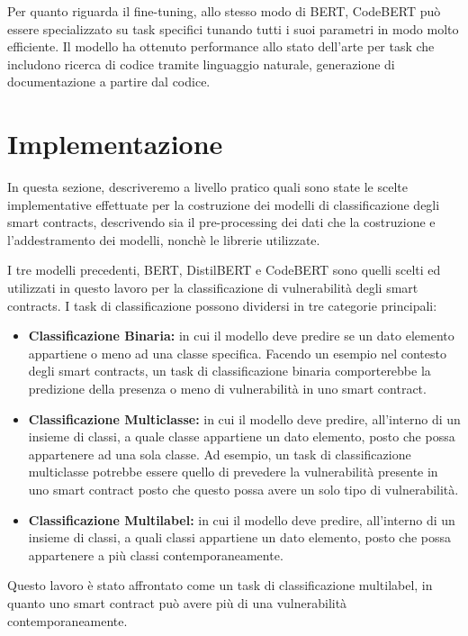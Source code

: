 \documentclass[../../Thesis.tex]{subfiles}
\begin{document}
Per quanto riguarda il fine-tuning, allo stesso modo di BERT, CodeBERT può essere specializzato su task specifici tunando tutti i suoi parametri in modo molto efficiente. Il modello ha ottenuto performance allo stato dell'arte per task che includono ricerca di codice tramite linguaggio naturale, generazione di documentazione a partire dal codice. 


\section{Implementazione}
In questa sezione, descriveremo a livello pratico quali sono state le scelte implementative effettuate per la costruzione dei modelli di classificazione degli smart contracts, descrivendo sia il pre-processing dei dati che la costruzione e l'addestramento dei modelli, nonchè le librerie utilizzate. 

I tre modelli precedenti, BERT, DistilBERT e CodeBERT sono quelli scelti ed utilizzati in questo lavoro per la classificazione di vulnerabilità degli smart contracts. I task di classificazione possono dividersi in tre categorie principali: 
\begin{itemize}
    \item \textbf{Classificazione Binaria:} in cui il modello deve predire se un dato elemento appartiene o meno ad una classe specifica. Facendo un esempio nel contesto degli smart contracts, un task di classificazione binaria comporterebbe la predizione della presenza o meno di vulnerabilità in uno smart contract. 
    \item \textbf{Classificazione Multiclasse:} in cui il modello deve predire, all'interno di un insieme di classi, a quale classe appartiene un dato elemento, posto che possa appartenere ad una sola classe. Ad esempio, un task di classificazione multiclasse potrebbe essere quello di prevedere la vulnerabilità presente in uno smart contract posto che questo possa avere un solo tipo di vulnerabilità.
    \item \textbf{Classificazione Multilabel:} in cui il modello deve predire, all'interno di un insieme di classi, a quali classi appartiene un dato elemento, posto che possa appartenere a più classi contemporaneamente. 
\end{itemize}
Questo lavoro è stato affrontato come un task di classificazione multilabel, in quanto uno smart contract può avere più di una vulnerabilità contemporaneamente. 
\end{document}
